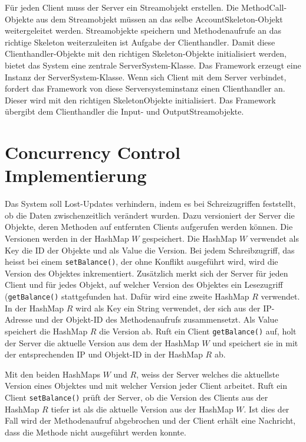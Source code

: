 Für jeden Client muss der Server ein Streamobjekt erstellen. Die
Method\-Call-Objekte aus dem Streamobjekt müssen an das selbe
AccountSkeleton-Objekt weitergeleitet werden. Streamobjekte speichern
und Methodenauf\-rufe an das richtige Skeleton weiterzuleiten ist
Aufgabe der Clienthandler. Damit diese Clienthandler-Objekte mit den
richtigen Skeleton-Objekte initialisiert werden, bietet das System
eine zentrale ServerSystem-Klasse. Das Framework erzeugt eine Instanz
der ServerSystem-Klasse. Wenn sich Client mit dem Server verbindet,
fordert das Framework von diese Serversystem\-instanz einen
Clienthandler an. Dieser wird mit den richtigen SkeletonObjekte
initialisiert. Das Framework übergibt dem Clienthandler die Input- und OutputStreamobjekte.

\section{Concurrency Control Implementierung }
\label{sec:conc-contr-impl}

Das System soll Lost-Updates verhindern, indem es bei Schreizugriffen
feststellt, ob die Daten zwischenzeitlich verändert wurden. Dazu
versioniert der Server die Objekte, deren Methoden auf entfernten
Clients aufgerufen werden können. Die Versionen werden in der HashMap
$W$ gespeichert. Die HashMap $W$ verwendet als Key die ID der Objekte
und als Value die Version. Bei jedem Schreibzugriff, das heisst bei
einem \verb|setBalance()|, der ohne Konflikt ausgeführt wird, wird die
Version des Objektes inkrementiert. Zusätzlich merkt sich der Server
für jeden Client und für jedes Objekt, auf welcher Version des
Objektes ein Lesezugriff (\verb|getBalance()| stattgefunden hat. Dafür
wird eine zweite HashMap $R$ verwendet. In der HashMap $R$ wird als Key
ein String verwendet, der sich aus der IP-Adresse und der
Objekt-ID des Methodenaufrufs zusammensetzt. Als Value speichert die HashMap $R$ die Version ab.
Ruft ein Client
\verb|getBalance()| auf, holt der Server die aktuelle Version aus dem
der HashMap $W$ und speichert sie in mit der entsprechenden IP und
Objekt-ID in der HashMap $R$ ab.

Mit den beiden HashMaps $W$ und $R$, weiss der Server welches die
aktuellste Version eines Objektes und mit welcher Version jeder Client
arbeitet. Ruft ein Client \verb|setBalance()| prüft der Server, ob die
Version des Clients aus der HashMap $R$ tiefer ist als die aktuelle
Version aus der HashMap $W$. Ist dies der Fall wird der Methodenaufruf
abgebrochen und der Client erhält eine Nachricht, dass die Methode
nicht ausgeführt werden konnte.